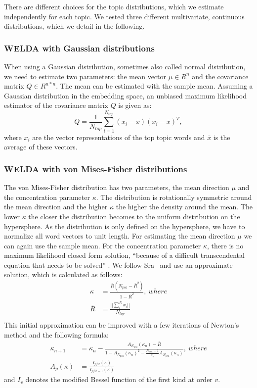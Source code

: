 \documentclass[
        a4paper,
        titlepage,
        twoside,
        parskip
        ]{scrbook}
\theoremstyle{break}
\begin{document}
There are different choices for the topic distributions, which we estimate independently for each topic.
We tested three different multivariate, continuous distributions, which we detail in the following.

\subsubsection{WELDA with Gaussian distributions}

When using a Gaussian distribution, sometimes also called normal distribution, we need to estimate two parameters: the mean vector $\mu \in R^n$ and the covariance matrix $Q \in R^{n * n}$.
The mean can be estimated with the sample mean.
Assuming a Gaussian distribution in the embedding space, an unbiased maximum likelihood estimator of the covariance matrix $Q$ is given as:
\begin{equation*}
  Q = \frac{1}{N_{top}} \sum\limits_{i=1}^{N_{top}} (x_i - \bar{x}) (x_i - \bar{x})^T,
\end{equation*}
where $x_i$ are the vector representations of the top topic words and $\bar{x}$ is the average of these vectors.
\subsubsection{WELDA with von Mises-Fisher distributions}
The von Mises-Fisher distribution has two parameters, the mean direction $\mu$ and the concentration parameter $\kappa$.
The distribution is rotationally symmetric around the mean direction and the higher $\kappa$ the higher the density around the mean.
The lower $\kappa$ the closer the distribution becomes to the uniform distribution on the hypersphere.
As the distribution is only defined on the hypersphere, we have to normalize all word vectors to unit length.
For estimating the mean direction $\mu$ we can again use the sample mean.
For the concentration parameter $\kappa$, there is no maximum likelihood closed form solution, ``because of a difficult transcendental equation that needs to be solved'' \cite{Sra2012}.
We follow Sra~\cite{Sra2012} and use an approximate solution, which is calculated as follows:
\begin{align*}
  \kappa &= \frac{\bar{R}(N_{pca} - \bar{R}^2)}{1 - \bar{R}^2},~where \\
  \bar{R} &= \frac{|| \sum_{i}^{N} x_i ||}{N_{top}} \\
\end{align*}
This initial approximation can be improved with a few iterations of Newton's method and the following formula:
\begin{align*}
  \kappa_{n + 1} &= \kappa_n - \frac{A_{N_{pca}}(\kappa_n)-\bar{R}}{1-A_{N_{pca}}(\kappa_n)^2-\frac{N_{pca}-1}{\kappa_n}A_{N_{pca}}(\kappa_n)},~where \\
  A_{p}(\kappa) &= \frac {I_{p/2}(\kappa)} {I_{p/2-1}(\kappa)}
\end{align*}
and $I_{v}$ denotes the modified Bessel function of the first kind at order $v$.
\end{document}
